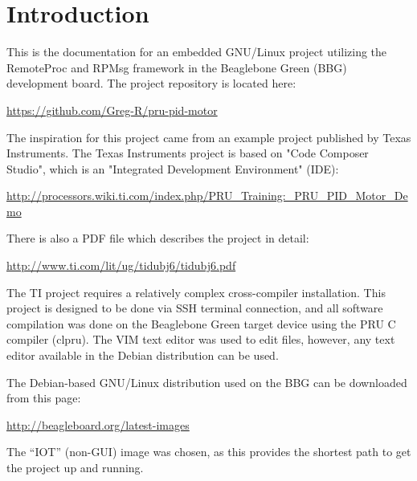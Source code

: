 %
%
%

\chapter{Introduction}

This is the documentation for an embedded GNU/Linux project utilizing the RemoteProc and RPMsg framework in the Beaglebone Green (BBG) development board.  The project repository is located here:

\url{https://github.com/Greg-R/pru-pid-motor}

The inspiration for this project came from an example project published by Texas Instruments.  The Texas Instruments project is based on "Code Composer Studio", which is an "Integrated Development Environment" (IDE):

\url{http://processors.wiki.ti.com/index.php/PRU_Training:_PRU_PID_Motor_Demo}

There is also a PDF file which describes the project in detail:

\url{http://www.ti.com/lit/ug/tidubj6/tidubj6.pdf}

The TI project requires a relatively complex cross-compiler installation.  This project is designed to be done via SSH terminal connection, and all software compilation was done on the Beaglebone Green target device using the PRU C compiler (clpru).  The VIM text editor was used to edit files, however, any text editor available in the Debian distribution can be used.

The Debian-based GNU/Linux distribution used on the BBG can be downloaded from this page:

\url{http://beagleboard.org/latest-images}

The ``IOT'' (non-GUI) image was chosen, as this provides the shortest path to get the project up and running.

